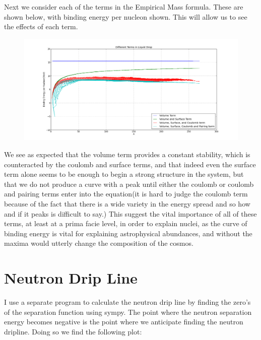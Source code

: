 \documentclass[11pt]{article} %
\begin{document}
Next we consider each of the terms in the Empirical Mass formula. These are shown below, with binding energy per nucleon shown. 
This will allow us to see the effects of each term. 


\vspace{1mm}
\begin{figure}[h]
\centering
\includegraphics[width=\linewidth]{"LiquidDropTerms"}
\end{figure}
\vspace{1mm}

We see as expected that the volume term provides a constant stability, which is counteracted by the coulomb and surface terms, and that indeed even the surface term alone seems to be enough to begin a strong structure in the system, but that we do not produce a curve with a peak until either the coulomb or coulomb and pairing terms enter into the equation(it is hard to judge the coulomb term because of the fact that there is a wide variety in the energy spread and so how and if it peaks is difficult to say.) This suggest the vital importance of all of these terms, at least at a prima facie level, in order to explain nuclei, as  the curve of binding energy is vital for explaining astrophysical abundances, and without the maxima would utterly change the composition of the cosmos.\\
\newpage

\section{Neutron Drip Line}

I use a separate program to calculate the neutron drip line by finding the zero's of the separation function using sympy. The point where the neutron separation energy becomes negative is the point where we anticipate finding the neutron dripline. Doing so we find the following plot:\\
\end{document}
